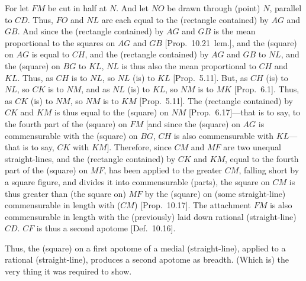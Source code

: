 \begin{Parallel}{}{}
{For let $FM$ be cut in half at $N$. And let $NO$ be drawn
through (point) $N$, parallel to $CD$. Thus, $FO$ and
$NL$ are each equal to the (rectangle contained) by $AG$ and $GB$.
And since
the (rectangle contained) by $AG$ and $GB$ is the mean
proportional to the squares on $AG$ and $GB$ [Prop.~10.21~lem.], and the (square) on $AG$
is equal to $CH$, and the (rectangle contained) by $AG$ and
$GB$ to $NL$, and the (square) on $BG$ to $KL$,  $NL$ is thus also the
mean proportional to $CH$ and $KL$. Thus, as $CH$ is to $NL$, so
$NL$ (is) to $KL$ [Prop.~5.11]. But, as $CH$ (is) to $NL$, so $CK$ is to
$NM$, and as $NL$ (is) to $KL$, so $NM$ is to $MK$
[Prop.~6.1]. Thus, as $CK$ (is) to $NM$, so $NM$
is to $KM$ [Prop.~5.11]. The (rectangle contained) by  $CK$ and $KM$ is thus
equal to the (square) on $NM$ [Prop.~6.17]---that is to say, to the fourth part of the
(square) on $FM$ [and since the (square) on $AG$ is commensurable
with the (square) on $BG$, $CH$ is also commensurable with $KL$---that is to say, $CK$ with $KM$].  Therefore, since $CM$ and $MF$ are two
unequal straight-lines, and the (rectangle contained) by $CK$ and
$KM$, equal to the fourth part
of the (square) on $MF$,  has been applied to the greater $CM$,
falling short by a square figure, and divides it into commensurable
(parts), the square on $CM$ is thus greater than (the square on)
$MF$ by the (square) on (some straight-line) commensurable
in length with ($CM$) [Prop.~10.17]. The
attachment $FM$ is also commensurable in length with the (previously)
laid down rational (straight-line) $CD$. $CF$ is thus a second apotome [Def.~10.16].

Thus, the (square) on a first apotome of
a medial (straight-line), applied to a rational (straight-line), produces
 a second apotome as breadth. (Which is) the very thing it was required to
show.}
\end{Parallel}


